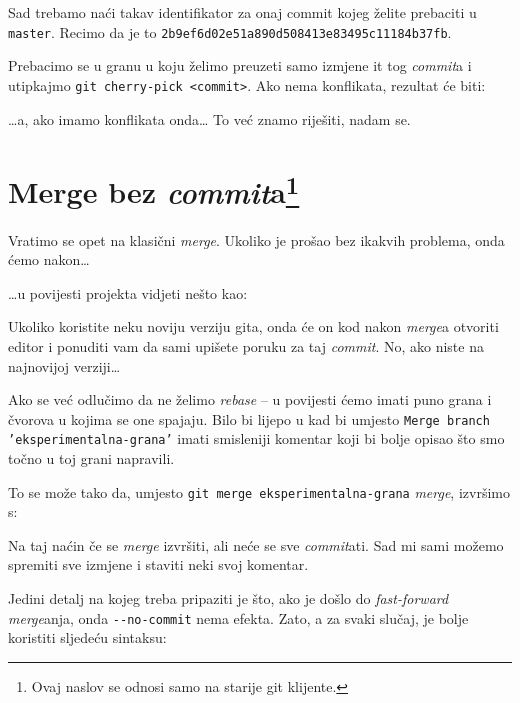 Sad trebamo naći takav identifikator za onaj commit kojeg želite prebaciti u \verb+master+. Recimo da je to \verb+2b9ef6d02e51a890d508413e83495c11184b37fb+.

Prebacimo se u granu u koju želimo preuzeti samo izmjene it tog \emph{commit}a i utipkajmo \verb+git cherry-pick <commit>+.
Ako nema konflikata, rezultat će biti:



\dots{}a, ako imamo konflikata onda\dots 
To već znamo riješiti, nadam se.

\section*{Merge bez \emph{commit}a\footnote{Ovaj naslov se odnosi samo na starije git klijente.}}

Vratimo se opet na klasični \emph{merge}.
Ukoliko je prošao bez ikakvih problema, onda ćemo nakon\dots



\dots{}u povijesti projekta vidjeti nešto kao:



Ukoliko koristite neku noviju verziju gita, onda će on kod nakon \emph{merge}a otvoriti editor i ponuditi vam da sami upišete poruku za taj \emph{commit}.
No, ako niste na najnovijoj verziji\dots

Ako se već odlučimo da ne želimo \emph{rebase} -- u povijesti ćemo imati puno grana i čvorova u kojima se one spajaju.
Bilo bi lijepo u kad bi umjesto \texttt{Merge branch 'eksperimentalna-grana'} imati smisleniji komentar koji bi bolje opisao što smo točno u toj grani napravili.

To se može tako da, umjesto \verb+git merge eksperimentalna-grana+ \emph{merge}, izvršimo s:


Na taj naćin če se \emph{merge} izvršiti, ali neće se sve \emph{commit}ati. 
Sad mi sami možemo spremiti sve izmjene i staviti neki svoj komentar.

Jedini detalj na kojeg treba pripaziti je što, ako je došlo do \emph{fast-forward} \emph{merge}anja, onda \verb+--no-commit+ nema efekta.
Zato, a za svaki slučaj, je bolje koristiti sljedeću sintaksu:



